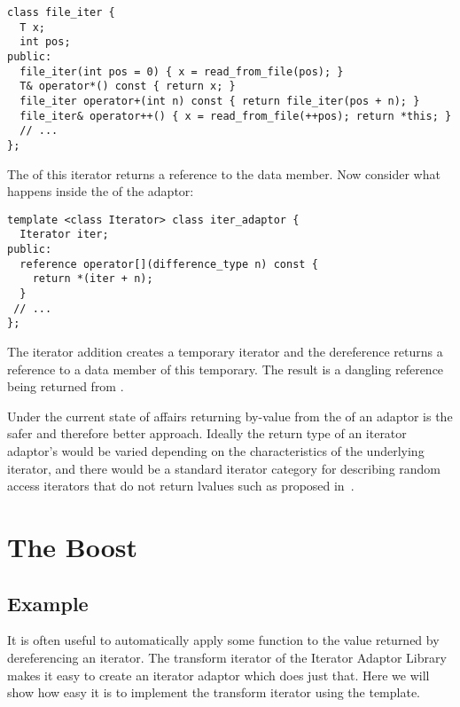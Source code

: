 \documentclass{netobjectdays}
\begin{document}
{\footnotesize
\begin{verbatim}
class file_iter {
  T x;
  int pos;
public:
  file_iter(int pos = 0) { x = read_from_file(pos); }
  T& operator*() const { return x; }
  file_iter operator+(int n) const { return file_iter(pos + n); }
  file_iter& operator++() { x = read_from_file(++pos); return *this; }
  // ...
};
\end{verbatim}
}

\noindent The  of this iterator returns a reference to
the data member. Now consider what happens inside the
 of the adaptor:

{\footnotesize
\begin{verbatim}
template <class Iterator> class iter_adaptor {
  Iterator iter;
public:
  reference operator[](difference_type n) const {
    return *(iter + n);
  }
 // ...
};
\end{verbatim}
}

\noindent The iterator addition creates a temporary iterator and the
dereference returns a reference to a data member of this
temporary. The result is a dangling reference being returned from
.

Under the current state of affairs returning by-value from the
 of an adaptor is the safer and therefore better
approach.  Ideally the return type of an iterator adaptor's
 would be varied depending on the characteristics of
the underlying iterator, and there would be a standard iterator
category for describing random access iterators that do not return
lvalues such as proposed in~\cite{siek01:_improved_iter_cat}.



\section{The Boost }



\subsection{Example}

It is often useful to automatically apply some function to the value
returned by dereferencing an iterator. The transform iterator of the
Iterator Adaptor Library makes it easy to create an iterator adaptor
which does just that. Here we will show how easy it is to implement
the transform iterator using the
 template.
\end{document}
